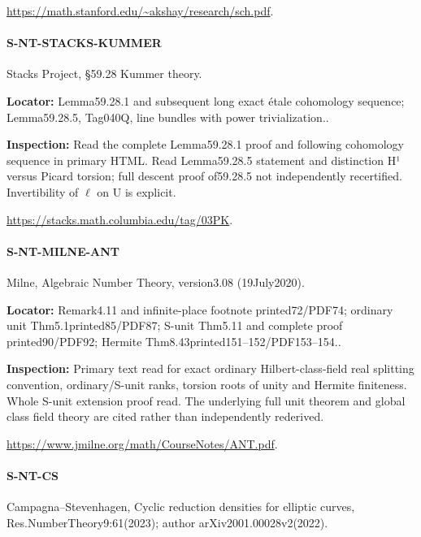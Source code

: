 \documentclass[11pt,a4paper]{article}
\begin{document}
\url{https://math.stanford.edu/~akshay/research/sch.pdf}.

\paragraph{S-NT-STACKS-KUMMER} Stacks Project, §59.\allowbreak{}28 Kummer theory.

\textbf{Locator:} Lemma59.\allowbreak{}28.\allowbreak{}1 and subsequent long exact étale cohomology sequence; Lemma59.\allowbreak{}28.\allowbreak{}5, Tag040Q, line bundles with power trivialization.\allowbreak{}.

\textbf{Inspection:} Read the complete Lemma59.\allowbreak{}28.\allowbreak{}1 proof and following cohomology sequence in primary HTML.\allowbreak{} Read Lemma59.\allowbreak{}28.\allowbreak{}5 statement and distinction H¹ versus Picard torsion; full descent proof of59.\allowbreak{}28.\allowbreak{}5 not independently recertified.\allowbreak{} Invertibility of \ensuremath{\ell} on U is explicit.\allowbreak{}

\url{https://stacks.math.columbia.edu/tag/03PK}.

\paragraph{S-NT-MILNE-ANT} Milne, Algebraic Number Theory, version3.\allowbreak{}08 (19July2020).

\textbf{Locator:} Remark4.\allowbreak{}11 and infinite-place footnote printed72/\allowbreak{}PDF74; ordinary unit Thm5.\allowbreak{}1printed85/\allowbreak{}PDF87; S-unit Thm5.\allowbreak{}11 and complete proof printed90/\allowbreak{}PDF92; Hermite Thm8.\allowbreak{}43printed151–\allowbreak{}152/\allowbreak{}PDF153–\allowbreak{}154.\allowbreak{}.

\textbf{Inspection:} Primary text read for exact ordinary Hilbert-class-field real splitting convention, ordinary/\allowbreak{}S-unit ranks, torsion roots of unity and Hermite finiteness.\allowbreak{} Whole S-unit extension proof read.\allowbreak{} The underlying full unit theorem and global class field theory are cited rather than independently rederived.\allowbreak{}

\url{https://www.jmilne.org/math/CourseNotes/ANT.pdf}.

\paragraph{S-NT-CS} Campagna–\allowbreak{}Stevenhagen, Cyclic reduction densities for elliptic curves, Res.\allowbreak{}NumberTheory9:\allowbreak{}61(2023); author arXiv2001.\allowbreak{}00028v2(2022).
\end{document}
